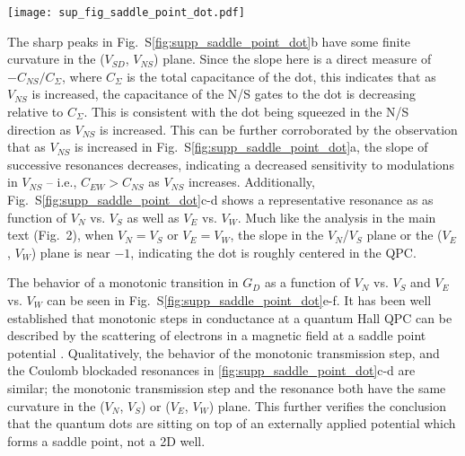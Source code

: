 \documentclass[reprint,prl,aps,superscriptaddress]{revtex4-1}
\begin{document}
\begin{figure*}[ht]
    \centering
    \texttt{[image: sup\_fig\_saddle\_point\_dot.pdf]}
    \caption{\textbf{Coulomb blockaded resonances on the electron side.} All data in this figure was taken at B = 9T and T = 20mK.  \textbf{(a)} Two terminal conductance across the device plotted against $V_{NS}$ and $V_{EW}$.  \textbf{(b)} Differential conductance versus source-drain bias plotted along the white dashed line in (a) as well as the corresponding zero-bias line cut.  Along the white dashed line $\nu_{EW} = 3$ and $\nu_{NS} = 0$. \textbf{(c-d)} Two terminal conductance plotted against $V_{N(W)}$ and $V_{S(E)}$ for the Coulomb blockaded resonances marked by the white dashed line in (a). The primary resonance shown in (d) is demarcated by the white dot in (a). \textbf{(e-f)} Diagonal conductance across the device plotted against $V_{N(W)}$ and $V_{S(E)}$ for the transmission step between $G_D = 1$, and $G_D = 2$. } 
    \label{fig:supp_saddle_point_dot}
\end{figure*}

The sharp peaks in Fig.~S\ref{fig:supp_saddle_point_dot}b have some finite curvature in the ($V_{SD}$, $V_{NS}$) plane. Since the slope here is a direct measure of $-C_{NS} / C_{\Sigma}$, where $C_{\Sigma}$ is the total capacitance of the dot, this indicates that as $V_{NS}$ is increased, the capacitance of the N/S gates to the dot is decreasing relative to $C_{\Sigma}$.  This is consistent with the dot being squeezed in the N/S direction as $V_{NS}$ is increased.  This can be further corroborated by the observation that as $V_{NS}$ is increased in Fig.~S\ref{fig:supp_saddle_point_dot}a, the slope of successive resonances decreases, indicating a decreased sensitivity to modulations in $V_{NS}$ -- i.e., $C_{EW} > C_{NS}$ as $V_{NS}$ increases.  Additionally, Fig.~S\ref{fig:supp_saddle_point_dot}c-d shows a representative resonance as as function of $V_N$ vs. $V_S$ as well as $V_E$ vs. $V_W$.  Much like the analysis in the main text (Fig.~2), when $V_N = V_S$ or $V_E = V_W$, the slope in the $V_N$/$V_S$ plane or the ($V_E$, $V_W$) plane is near $-1$, indicating the dot is roughly centered in the QPC.

The behavior of a monotonic transition in $G_D$ as a function of $V_{N}$ vs. $V_{S}$ and $V_{E}$ vs. $V_{W}$ can be seen in Fig.~S\ref{fig:supp_saddle_point_dot}e-f.  It has been well established that monotonic steps in conductance at a quantum Hall QPC can be described by the scattering of electrons in a magnetic field at a saddle point potential \cite{floser_transmission_2010}.  Qualitatively, the behavior of the monotonic transmission step, and the Coulomb blockaded resonances in \ref{fig:supp_saddle_point_dot}c-d are similar; the monotonic transmission step and the resonance both have the same curvature in the ($V_N$, $V_S$) or ($V_E$, $V_W$) plane.  This further verifies the conclusion that the quantum dots are sitting on top of an externally applied potential which forms a saddle point, not a 2D well.
\end{document}
